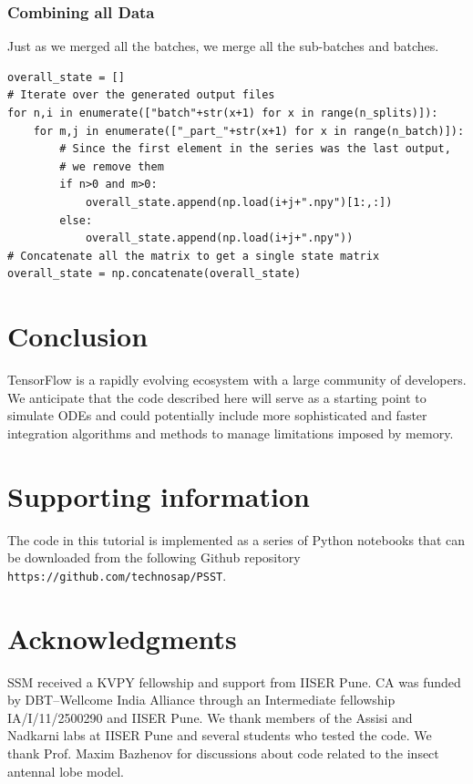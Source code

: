 \documentclass[10pt,letterpaper]{article}
\begin{document}
\subsubsection*{Combining all Data}
Just as we merged all the batches, we merge all the sub-batches and batches.

\begin{verbatim}
overall_state = []
# Iterate over the generated output files
for n,i in enumerate(["batch"+str(x+1) for x in range(n_splits)]):
    for m,j in enumerate(["_part_"+str(x+1) for x in range(n_batch)]):
        # Since the first element in the series was the last output, 
        # we remove them
        if n>0 and m>0:
            overall_state.append(np.load(i+j+".npy")[1:,:])
        else:
            overall_state.append(np.load(i+j+".npy"))
# Concatenate all the matrix to get a single state matrix
overall_state = np.concatenate(overall_state)
\end{verbatim}

\section*{Conclusion}
TensorFlow is a rapidly evolving ecosystem with a large community of developers. We anticipate that the code described here will serve as a starting point to simulate ODEs and could potentially include more sophisticated and faster integration algorithms and methods to manage limitations imposed by memory. 

\section*{Supporting information}
The code in this tutorial is implemented as a series of Python notebooks that can be downloaded from the following Github repository \texttt{https://github.com/technosap/PSST}. 
\section*{Acknowledgments}
SSM received a KVPY fellowship and support from IISER Pune. CA was funded by DBT–Wellcome India Alliance through an Intermediate fellowship IA/I/11/2500290 and IISER Pune. We thank members of the Assisi and Nadkarni labs at IISER Pune and several students who tested the code.  We thank Prof. Maxim Bazhenov for discussions about code related to the insect antennal lobe model.


\end{document}
